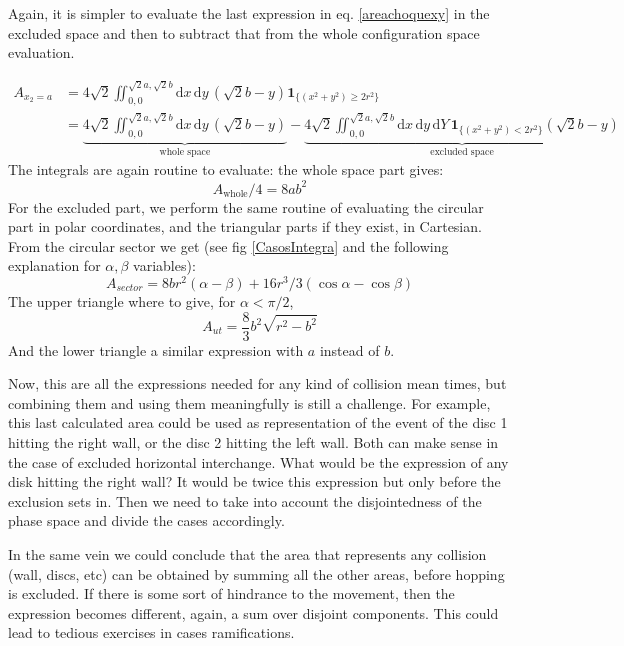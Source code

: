 \documentclass[superscriptaddress,pre,reprint,showpacs,onecolumn]{revtex4-1}
\newcommand{\rd}[1]{\mathrm{d}{#1} \,}
\newcommand{\indicatorsymbol}{\mathbf{1}}
\newcommand{\indicator}[1]{\indicatorsymbol_{ \{   #1 \} } }
\begin{document}
    Again, it is simpler to evaluate the last expression in eq. \ref{areachoquexy}
    in the excluded space and then to subtract that from the whole configuration
    space evaluation.

    \begin{align}
      A_{x_2=a} & =4\sqrt{2}\iint_{0,0}^{\sqrt{2}a,\sqrt{2}b}
        \rd x \rd y (\sqrt{2} b - y)
        \indicator{(x^2+y^2) \geq 2 r^2}\\
     &=\underbrace{4\sqrt{2}\iint_{0,0}^{\sqrt{2}a,\sqrt{2}b}
        \rd x \rd y (\sqrt{2} b - y)}_{\text{whole space}}
        -\underbrace{
          4\sqrt{2}\iint_{0,0}^{\sqrt{2}a,\sqrt{2}b}
        \rd x \rd y \rd Y 
        \indicator{(x^2+y^2) < 2 r^2}(\sqrt{2} b - y)}_{\text{excluded space}}
       \end{align}
    The integrals are again routine to evaluate: the whole space part
    gives:
    \begin{equation}
      A_{\text{whole}}/4=8ab^2
    \end{equation}
    For the excluded part, we perform the same routine of evaluating the circular part
    in polar coordinates, and the triangular parts if they exist, in Cartesian.
    From the circular sector we get (see fig \ref{CasosIntegra} and the following explanation
    for $\alpha, \beta$ variables):
    \begin{equation}
      A_{sector}=8 b r^2(\alpha-\beta)+16r^3/3(\cos\alpha - \cos\beta)
    \end{equation}
    The upper triangle where to give, for $\alpha < \pi/2$,
    \begin{equation}
    A_{ut}=\frac{8}{3}b^2\sqrt{r^2-b^2}
    \end{equation}
    And the lower triangle a similar expression with $a$ instead of $b$.

    Now, this are  all the expressions needed for any kind of collision mean
    times, but combining
    them and using them meaningfully is still a challenge. For example,
    this last calculated area could be used as representation of the event of
    the disc 1 hitting the right wall, or the disc 2 hitting the left wall. Both
    can make sense in the case of excluded horizontal interchange. What would be
    the expression of any disk hitting the right wall? It would be twice this expression
    but only before the exclusion sets in. Then we need to take into account
    the disjointedness of the phase space and divide the cases accordingly.

    In the same vein we could conclude that the area that represents
    any collision (wall, discs, etc) can be obtained by summing all the other
    areas, before hopping is excluded. If there is some sort of hindrance to
    the movement, then the expression becomes different, again, a sum over
    disjoint components. This could lead to tedious exercises in cases ramifications.
\end{document}
